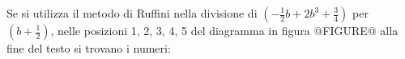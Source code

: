 Se si utilizza il metodo di Ruffini nella divisione di
$\left(  - \frac{1}{2} b  + 2 b^3 + \frac{3}{4} \right)$ per $\left( b +  \frac{1}{2} \right)$,
nelle posizioni 1, 2, 3, 4, 5 del diagramma 
in figura @FIGURE@ alla fine del testo
si trovano i numeri:

